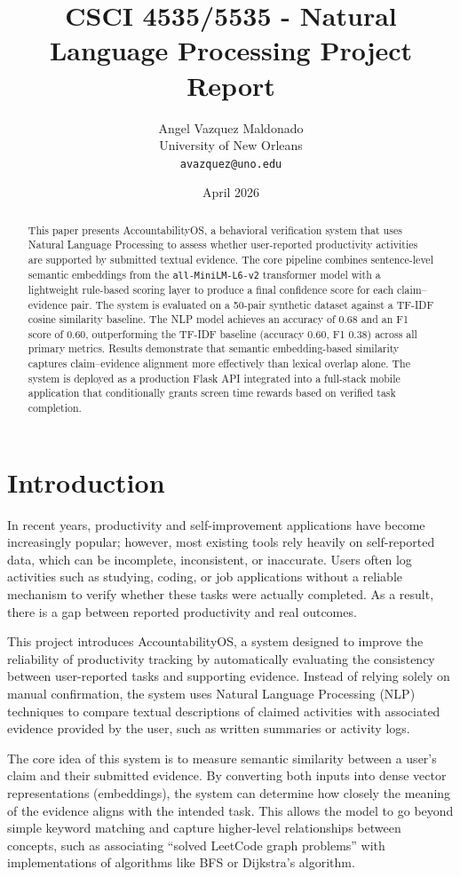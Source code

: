 \documentclass[11pt]{article}
\title{CSCI 4535/5535 - Natural Language Processing Project Report}
\author{Angel Vazquez Maldonado\\
        University of New Orleans\\
        \texttt{avazquez@uno.edu}}
\date{April 2026}
\begin{document}
\maketitle

\begin{abstract}
This paper presents AccountabilityOS, a behavioral verification system that uses
Natural Language Processing to assess whether user-reported productivity activities
are supported by submitted textual evidence. The core pipeline combines sentence-level
semantic embeddings from the \texttt{all-MiniLM-L6-v2} transformer model with a
lightweight rule-based scoring layer to produce a final confidence score for each
claim--evidence pair. The system is evaluated on a 50-pair synthetic dataset against
a TF-IDF cosine similarity baseline. The NLP model achieves an accuracy of 0.68 and
an F1 score of 0.60, outperforming the TF-IDF baseline (accuracy 0.60, F1 0.38)
across all primary metrics. Results demonstrate that semantic embedding-based
similarity captures claim--evidence alignment more effectively than lexical overlap
alone. The system is deployed as a production Flask API integrated into a full-stack
mobile application that conditionally grants screen time rewards based on verified
task completion.
\end{abstract}

\section{Introduction}

In recent years, productivity and self-improvement applications have become
increasingly popular; however, most existing tools rely heavily on self-reported data,
which can be incomplete, inconsistent, or inaccurate. Users often log activities such
as studying, coding, or job applications without a reliable mechanism to verify whether
these tasks were actually completed. As a result, there is a gap between reported
productivity and real outcomes.

This project introduces AccountabilityOS, a system designed to improve the reliability
of productivity tracking by automatically evaluating the consistency between
user-reported tasks and supporting evidence. Instead of relying solely on manual
confirmation, the system uses Natural Language Processing (NLP) techniques to compare
textual descriptions of claimed activities with associated evidence provided by the
user, such as written summaries or activity logs.

The core idea of this system is to measure semantic similarity between a user's claim
and their submitted evidence. By converting both inputs into dense vector
representations (embeddings), the system can determine how closely the meaning of the
evidence aligns with the intended task. This allows the model to go beyond simple
keyword matching and capture higher-level relationships between concepts, such as
associating ``solved LeetCode graph problems'' with implementations of algorithms like
BFS or Dijkstra's algorithm.
\end{document}
